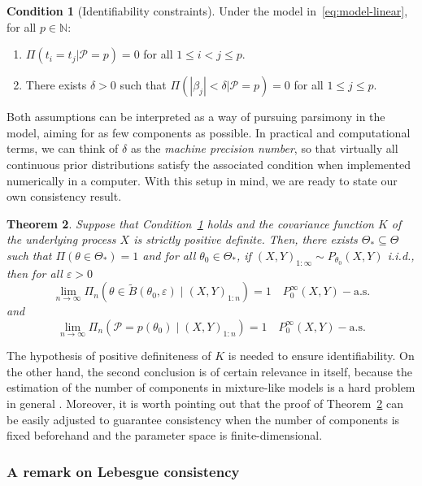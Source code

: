 \documentclass{article}
\numberwithin{equation}{section}
\theoremstyle{plain}
\newtheorem{theorem}{Theorem}
\theoremstyle{definition}
\newtheorem{condition}[theorem]{Condition}
\renewcommand{\epsilon}{\varepsilon}
\newcommand{\N}{\mathbb{N}}
\begin{document}
\begin{condition}[Identifiability constraints] Under the model in~\eqref{eq:model-linear}, for all \(p\in\N\):\label{cond:condition-ident}
  \begin{enumerate}[label=(\roman*)]
    \item \(\Pi(t_i=t_j|\mathcal P=p)=0\) for all \(1\leq i < j \leq p\).\label{cond:condition-ident-1}
    \item There exists \(\delta>0\) such that \(\Pi(|\beta_j|<\delta|\mathcal P=p)=0\) for all \(1\leq j \leq p\).\label{cond:condition-ident-2}
  \end{enumerate}
\end{condition}
Both assumptions can be interpreted as a way of pursuing parsimony in the model, aiming for as few components as possible. In practical and computational terms, we can think of \(\delta\) as the \textit{machine precision number}, so that virtually all continuous prior distributions satisfy the associated condition when implemented numerically in a computer. With this setup in mind, we are ready to state our own consistency result.

\begin{theorem}\label{th:consistency-doob-linear}
  Suppose that Condition~\ref{cond:condition-ident} holds and the covariance function \(K\) of the underlying process \(X\) is strictly positive definite. Then, there exists \(\Theta_*\subseteq \Theta\) such that \(\Pi(\theta \in \Theta_*)=1\) and for all \(\theta_0\in\Theta_*\), if \((X,Y)_{1:\infty} \sim P_{\theta_0}(X,Y)\) i.i.d., then for all \(\epsilon > 0\)
  \[
    \lim_{n\to\infty} \Pi_n(\theta \in \tilde{B}(\theta_0,\epsilon) \mid (X,Y)_{1:n}) = 1 \quad P_{0}^\infty(X,Y)-\text{a.s.}
  \]
  and
  \[
    \lim_{n\to\infty} \Pi_n(\mathcal P=p(\theta_0) \mid (X,Y)_{1:n}) = 1 \quad P_{0}^\infty(X,Y)-\text{a.s.}
  \]
\end{theorem}

The hypothesis of positive definiteness of \(K\) is needed to ensure identifiability. On the other hand, the second conclusion is of certain relevance in itself, because the estimation of the number of components in mixture-like models is a hard problem in general \citep[see][and references therein]{miller2018mixture}. Moreover, it is worth pointing out that the proof of Theorem~\ref{th:consistency-doob-linear} can be easily adjusted to guarantee consistency when the number of components is fixed beforehand and the parameter space is finite-dimensional.

\subsubsection*{A remark on Lebesgue consistency}
\end{document}
